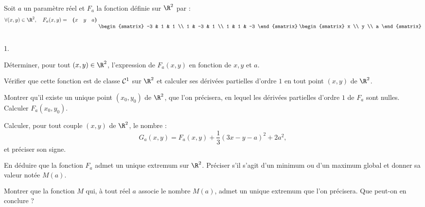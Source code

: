 \documentclass[11pt]{article}%
\begin{document}
\begin{exercice}[ESCP 2002]~\\
\noindent
Soit $a$ un paramètre réel et $F_a$ la fonction définie sur $\R^2$ par :
\[
  \begin{matrix}
    \forall (x,y)\in\R^2,\quad  F_a(x,y)=& \textbf{(}x & y & 
    a\textbf{)} \\ & & &
    \\
    & & & 
  \end{matrix}
  \;
  \begin{smatrix} 
    -3 & 1 & 1 \\
    1 & -3 & 1 \\ 
    1 & 1 & -3
  \end{smatrix}
  \; 
  \begin{smatrix} 
    x \\ 
    y \\ 
    a 
  \end{smatrix}
\]
\begin{noliste}{1.}
  \item Déterminer, pour tout $(x,y)\in\R^2$, l'expression de $F_a(x,y)$ en 
  fonction de $x,y$ et $a$.
  
  \item Vérifier que cette fonction est de classe $\mathcal{C}^{1}$ sur $\R^2$ et 
  calculer ses dérivées partielles d'ordre $1$ en tout point $(x,y)$ de 
  $\R^2$.
  
  \item Montrer qu'il existe un unique point $(x_0,y_0)$ de $\R^2$, que 
  l'on précisera, en lequel les dérivées partielles d'ordre $1$ de $F_a$ sont
  nulles. Calculer $F_a(x_0,y_0)$.
  
  \item Calculer, pour tout couple $(x,y)$ de $\R^2$, le nombre :
  \[
    G_a(x,y)=F_a(x,y)+\frac{1}{3}(3x-y-a)^2+2a^2,
  \]
  et préciser son signe.	
  
  \item En déduire que la fonction $F_a$ admet un unique extremum sur $\R^2$. 
  Préciser s'il s'agit d'un minimum ou d'un maximum global et donner sa valeur 
  notée $M(a)$.
  
  \item Montrer que la fonction $M$ qui, à tout réel $a$ associe le nombre 
  $M(a)$, admet un unique extremum que l'on précisera. Que peut-on en conclure 
  ?
\end{noliste}
\end{exercice}


\newpage
\end{document}
